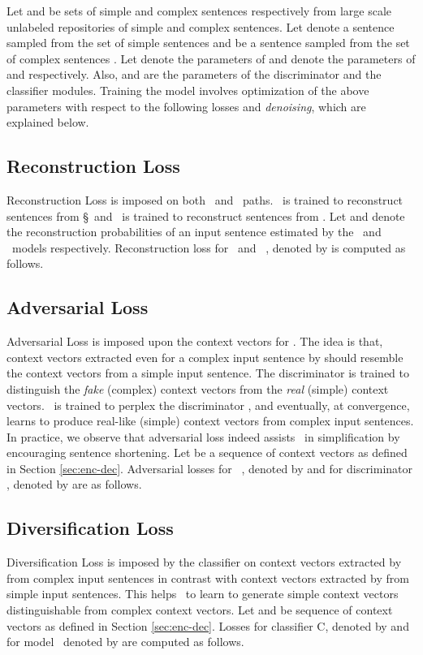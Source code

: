 \documentclass[11pt,a4paper]{article}
\begin{document}
Let  and  be sets of simple and complex sentences respectively from large scale  unlabeled repositories of simple and complex sentences. Let  denote a sentence sampled from the set of simple sentences  and  be a sentence sampled from the set of complex sentences .
Let  denote the parameters of  and  denote the parameters of  and  respectively. Also,  and  are the parameters of the discriminator and the classifier modules.
Training the model involves optimization of the above parameters with respect to the following losses and \textit{denoising}, which are explained below.

\subsection{Reconstruction Loss}
\label{sec:reconst}
Reconstruction Loss is imposed on both \simplf\ and \compl\ paths. \simplf\ is trained to reconstruct sentences from \S\ and \compl\ is trained to reconstruct sentences from \D. 
Let  and  denote the reconstruction probabilities of an input sentence  estimated by the \simplf\ and \compl\ models respectively. Reconstruction loss for \simplf\ and \compl\ , denoted by  is computed as follows.

\subsection{Adversarial Loss} 
\label{sec:advloss}
Adversarial Loss is imposed upon the context vectors for . The idea is that, context vectors extracted even for a complex input sentence by  should resemble the context vectors from a simple input sentence. The discriminator  is trained to distinguish the \textit{fake} (complex) context vectors from the \textit{real} (simple) context vectors. \simplf\ is trained to perplex the discriminator , and eventually, at convergence, learns to produce real-like (simple) context vectors from complex input sentences. In practice, we observe that adversarial loss indeed assists \simplf\ in simplification by encouraging sentence shortening. Let  be a sequence of context vectors as defined in Section \ref{sec:enc-dec}. Adversarial losses for \simplf\ , denoted by  and for discriminator , denoted by  are as follows.

\subsection{Diversification Loss}
\label{sec:clfloss}
Diversification Loss is imposed by the classifier  on context vectors extracted by  from complex input sentences in contrast with context vectors extracted by  from simple input sentences. This helps \simplf\ to learn to generate simple context vectors distinguishable from complex context vectors. Let  and  be sequence of context vectors as defined in Section \ref{sec:enc-dec}. Losses for classifier C, denoted by  and for model \simplf\, denoted by  are computed as follows.
\end{document}
